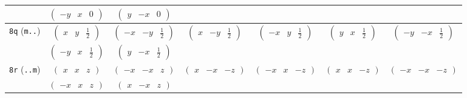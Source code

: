 \documentclass[fleqn,9pt,landscape]{jsarticle}
\begin{document}
\begin{center}
\begin{longtable}{ccccccc}
& $ \begin{pmatrix} - y & x & 0 \end{pmatrix} $ & $ \begin{pmatrix} y & - x & 0 \end{pmatrix} $ & $  $ & $  $ & $  $ & $  $ \\ \hline
{\tt 8q} ({\tt m..}) & $ \begin{pmatrix} x & y & \frac{1}{2} \end{pmatrix} $ & $ \begin{pmatrix} - x & - y & \frac{1}{2} \end{pmatrix} $ & $ \begin{pmatrix} x & - y & \frac{1}{2} \end{pmatrix} $ & $ \begin{pmatrix} - x & y & \frac{1}{2} \end{pmatrix} $ & $ \begin{pmatrix} y & x & \frac{1}{2} \end{pmatrix} $ & $ \begin{pmatrix} - y & - x & \frac{1}{2} \end{pmatrix} $ \\
& $ \begin{pmatrix} - y & x & \frac{1}{2} \end{pmatrix} $ & $ \begin{pmatrix} y & - x & \frac{1}{2} \end{pmatrix} $ & $  $ & $  $ & $  $ & $  $ \\ \hline
{\tt 8r} ({\tt ..m}) & $ \begin{pmatrix} x & x & z \end{pmatrix} $ & $ \begin{pmatrix} - x & - x & z \end{pmatrix} $ & $ \begin{pmatrix} x & - x & - z \end{pmatrix} $ & $ \begin{pmatrix} - x & x & - z \end{pmatrix} $ & $ \begin{pmatrix} x & x & - z \end{pmatrix} $ & $ \begin{pmatrix} - x & - x & - z \end{pmatrix} $ \\
& $ \begin{pmatrix} - x & x & z \end{pmatrix} $ & $ \begin{pmatrix} x & - x & z \end{pmatrix} $ & $  $ & $  $ & $  $ & $  $ \\ \hline

\end{longtable}
\end{center}
\end{document}
